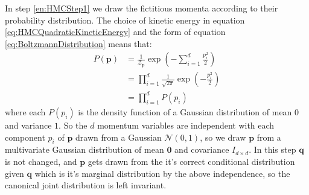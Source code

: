 \documentclass[12pt]{article}
\begin{document}
            In step \ref{en:HMCStep1} we draw the fictitious momenta according to their probability distribution. The choice of kinetic energy in equation \ref{eq:HMCQuadraticKineticEnergy} and the form of equation \ref{eq:BoltzmannDistribution} means that:
            \begin{align}
                \label{eq:KineticBoltzmannDistribution}
                P\left(\bm{p}\right) & = \frac{1}{\mathcal{Z}_{\bm{p}}}\exp{\left(-\sum_{i=1}^{d}\frac{p_i^2}{2}\right)} \\
                                     & = \prod_{i=1}^d\frac{1}{\sqrt{2\pi}} \exp{\left(-\frac{p_i^2}{2}\right)} \\
                                     & = \prod_{i=1}^dP\left(p_i\right)
            \end{align}
            where each $P\left(p_i\right)$ is the density function of a Gaussian distribution of mean $0$ and variance $1$. So the $d$ momentum variables are independent with each component $p_i$ of $\bm{p}$ drawn from a Gaussian $\mathcal{N}{\left(0,1\right)}$, so we draw $\bm{p}$ from a multivariate Gaussian distribution of mean $\bm{0}$ and covariance $I_{d\times d}$. In this step $\bm{q}$ is not changed, and $\bm{p}$ gets drawn from the it's correct conditional distribution given $\bm{q}$ which is it's marginal distribution by the above independence, so the canonical joint distribution is left invariant.
\end{document}
